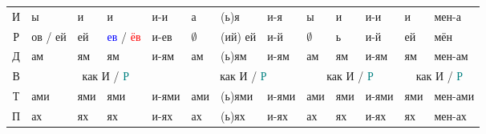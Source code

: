 \documentclass[a4paper, landscape, 11pt]{article}
\newcommand{\an}[1]{\textcolor{teal}{#1}} %
\newcommand{\us}[1]{\textcolor{blue}{#1}} %
\newcommand{\st}[1]{\textcolor{red}{#1}}  %
\begin{document}
\begin{tabularx}{\textwidth}{|c|XXXX|XXX|XXX|XX|}
	  И    & ы                   & и                 & и                 & и-и          & а           & (ь)я     & и-я        & ы           & и                 & и-и        & и                     & мен-а                  \\
	  Р    & ов / ей             & ей                & \us{ев} / \st{ёв} & и-ев         & $\emptyset$ & (ий) ей  & и-й        & $\emptyset$ & ь                 & и-й        & ей                    & мён                    \\
	  Д    & ам                  & ям                & ям                & и-ям         & ам          & (ь)ям    & и-ям       & ам          & ям                & и-ям       & ям                    & мен-ам                 \\ \cline{2-13}
	  В    &                    \multicolumn{4}{c|}{как И / \an{Р}}                     & \multicolumn{3}{c|}{как И / \an{Р}} &     \multicolumn{3}{c|}{как И / \an{Р}}      &      \multicolumn{2}{c|}{как И / \an{Р}}       \\ \cline{2-13}
	  Т    & ами                 & ями               & ями               & и-ями        & ами         & (ь)ями   & и-ями      & ами         & ями               & и-ями      & ями                   & мен-ами                \\
	  П    & ах                  & ях                & ях                & и-ях         & ах          & (ь)ях    & и-ях       & ах          & ях                & и-ях       & ях                    & мен-ах                 \\ \hline
\end{tabularx}
\end{document}
